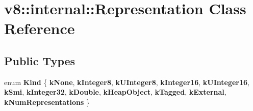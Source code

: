 \hypertarget{classv8_1_1internal_1_1Representation}{}\section{v8\+:\+:internal\+:\+:Representation Class Reference}
\label{classv8_1_1internal_1_1Representation}
\subsection*{Public Types}
\begin{DoxyCompactItemize}
\item 
\mbox{\label{classv8_1_1internal_1_1Representation_a08dbab898351309de7fa1fded4476d00}} 
enum {\bfseries Kind} \{ \newline
{\bfseries k\+None}, 
{\bfseries k\+Integer8}, 
{\bfseries k\+U\+Integer8}, 
{\bfseries k\+Integer16}, 
\newline
{\bfseries k\+U\+Integer16}, 
{\bfseries k\+Smi}, 
{\bfseries k\+Integer32}, 
{\bfseries k\+Double}, 
\newline
{\bfseries k\+Heap\+Object}, 
{\bfseries k\+Tagged}, 
{\bfseries k\+External}, 
{\bfseries k\+Num\+Representations}
 \}
\end{DoxyCompactItemize}
